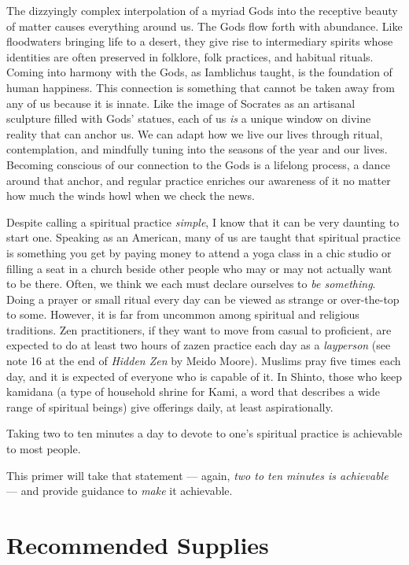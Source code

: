 \documentclass[
]{book}
\begin{document}
The dizzyingly complex interpolation of a myriad Gods into the receptive beauty of matter causes everything around us. The Gods flow forth with abundance. Like floodwaters bringing life to a desert, they give rise to intermediary spirits whose identities are often preserved in folklore, folk practices, and habitual rituals. Coming into harmony with the Gods, as Iamblichus taught, is the foundation of human happiness. This connection is something that cannot be taken away from any of us because it is innate. Like the image of Socrates as an artisanal sculpture filled with Gods' statues, each of us \emph{is} a unique window on divine reality that can anchor us. We can adapt how we live our lives through ritual, contemplation, and mindfully tuning into the seasons of the year and our lives. Becoming conscious of our connection to the Gods is a lifelong process, a dance around that anchor, and regular practice enriches our awareness of it no matter how much the winds howl when we check the news.

Despite calling a spiritual practice \emph{simple}, I know that it can be very daunting to start one. Speaking as an American, many of us are taught that spiritual practice is something you get by paying money to attend a yoga class in a chic studio or filling a seat in a church beside other people who may or may not actually want to be there. Often, we think we each must declare ourselves to \emph{be something}. Doing a prayer or small ritual every day can be viewed as strange or over-the-top to some. However, it is far from uncommon among spiritual and religious traditions. Zen practitioners, if they want to move from casual to proficient, are expected to do at least two hours of zazen practice each day as a \emph{layperson} (see note 16 at the end of \emph{Hidden Zen} by Meido Moore). Muslims pray five times each day, and it is expected of everyone who is capable of it. In Shinto, those who keep kamidana (a type of household shrine for Kami, a word that describes a wide range of spiritual beings) give offerings daily, at least aspirationally.

Taking two to ten minutes a day to devote to one's spiritual practice is achievable to most people.

This primer will take that statement --- again, \emph{two to ten minutes is achievable} --- and provide guidance to \emph{make} it achievable.

\hypertarget{recommended-supplies}{%
\section{Recommended Supplies}\label{recommended-supplies}}
\end{document}
